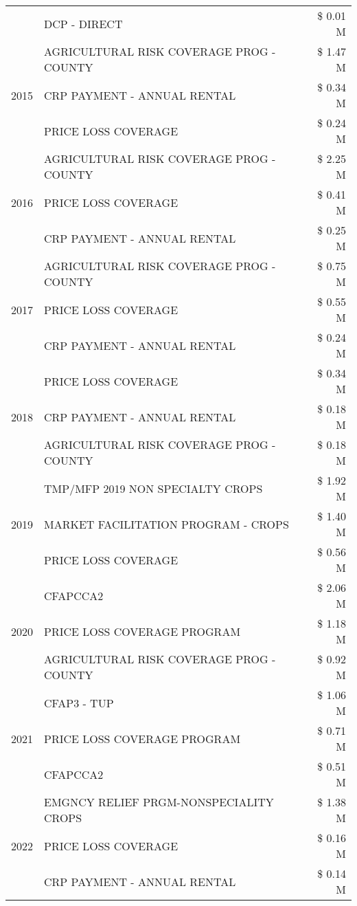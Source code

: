 \begin{tabular}{llr}
 & DCP - DIRECT & \$ 0.01 M \\
\cline{1-3}
\multirow[t]{3}{*}{2015} & AGRICULTURAL RISK COVERAGE PROG - COUNTY & \$ 1.47 M \\
 & CRP PAYMENT - ANNUAL RENTAL & \$ 0.34 M \\
 & PRICE LOSS COVERAGE & \$ 0.24 M \\
\cline{1-3}
\multirow[t]{3}{*}{2016} & AGRICULTURAL RISK COVERAGE PROG - COUNTY & \$ 2.25 M \\
 & PRICE LOSS COVERAGE & \$ 0.41 M \\
 & CRP PAYMENT - ANNUAL RENTAL & \$ 0.25 M \\
\cline{1-3}
\multirow[t]{3}{*}{2017} & AGRICULTURAL RISK COVERAGE PROG - COUNTY & \$ 0.75 M \\
 & PRICE LOSS COVERAGE & \$ 0.55 M \\
 & CRP PAYMENT - ANNUAL RENTAL & \$ 0.24 M \\
\cline{1-3}
\multirow[t]{3}{*}{2018} & PRICE LOSS COVERAGE & \$ 0.34 M \\
 & CRP PAYMENT - ANNUAL RENTAL & \$ 0.18 M \\
 & AGRICULTURAL RISK COVERAGE PROG - COUNTY & \$ 0.18 M \\
\cline{1-3}
\multirow[t]{3}{*}{2019} & TMP/MFP 2019 NON SPECIALTY CROPS & \$ 1.92 M \\
 & MARKET FACILITATION PROGRAM - CROPS & \$ 1.40 M \\
 & PRICE LOSS COVERAGE & \$ 0.56 M \\
\cline{1-3}
\multirow[t]{3}{*}{2020} & CFAPCCA2 & \$ 2.06 M \\
 & PRICE LOSS COVERAGE PROGRAM & \$ 1.18 M \\
 & AGRICULTURAL RISK COVERAGE PROG - COUNTY & \$ 0.92 M \\
\cline{1-3}
\multirow[t]{3}{*}{2021} & CFAP3 - TUP & \$ 1.06 M \\
 & PRICE LOSS COVERAGE PROGRAM & \$ 0.71 M \\
 & CFAPCCA2 & \$ 0.51 M \\
\cline{1-3}
\multirow[t]{3}{*}{2022} & EMGNCY RELIEF PRGM-NONSPECIALITY CROPS & \$ 1.38 M \\
 & PRICE LOSS COVERAGE & \$ 0.16 M \\
 & CRP PAYMENT - ANNUAL RENTAL & \$ 0.14 M \\
\cline{1-3}
\bottomrule
\end{tabular}
